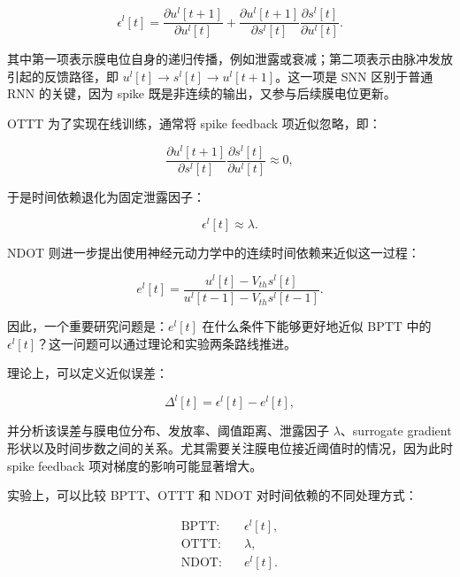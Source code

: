 \documentclass[11pt]{ctexart}
\begin{document}
\begin{equation}
\epsilon^l[t]
=
\frac{\partial u^l[t+1]}{\partial u^l[t]}
+
\frac{\partial u^l[t+1]}{\partial s^l[t]}
\frac{\partial s^l[t]}{\partial u^l[t]} .
\end{equation}

其中第一项表示膜电位自身的递归传播，例如泄露或衰减；第二项表示由脉冲发放引起的反馈路径，即 $u^l[t] \rightarrow s^l[t] \rightarrow u^l[t+1]$。这一项是 SNN 区别于普通 RNN 的关键，因为 spike 既是非连续的输出，又参与后续膜电位更新。

OTTT 为了实现在线训练，通常将 spike feedback 项近似忽略，即：

\begin{equation}
\frac{\partial u^l[t+1]}{\partial s^l[t]}
\frac{\partial s^l[t]}{\partial u^l[t]}
\approx 0,
\end{equation}

于是时间依赖退化为固定泄露因子：

\begin{equation}
\epsilon^l[t] \approx \lambda .
\end{equation}

NDOT 则进一步提出使用神经元动力学中的连续时间依赖来近似这一过程：

\begin{equation}
 e^l[t]
=
\frac{u^l[t]-V_{th}s^l[t]}
{u^l[t-1]-V_{th}s^l[t-1]} .
\end{equation}

因此，一个重要研究问题是：$e^l[t]$ 在什么条件下能够更好地近似 BPTT 中的 $\epsilon^l[t]$？这一问题可以通过理论和实验两条路线推进。

理论上，可以定义近似误差：

\begin{equation}
\Delta^l[t] = \epsilon^l[t] - e^l[t],
\end{equation}

并分析该误差与膜电位分布、发放率、阈值距离、泄露因子 $\lambda$、surrogate gradient 形状以及时间步数之间的关系。尤其需要关注膜电位接近阈值时的情况，因为此时 spike feedback 项对梯度的影响可能显著增大。

实验上，可以比较 BPTT、OTTT 和 NDOT 对时间依赖的不同处理方式：

\begin{equation}
\begin{aligned}
\text{BPTT:} \quad & \epsilon^l[t], \\
\text{OTTT:} \quad & \lambda, \\
\text{NDOT:} \quad & e^l[t].
\end{aligned}
\end{equation}
\end{document}
